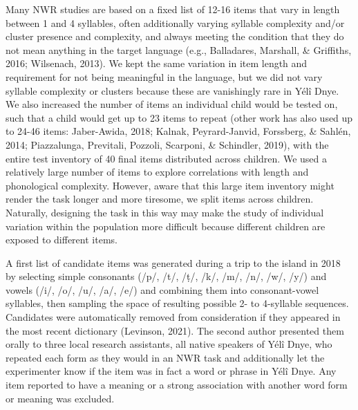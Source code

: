 \documentclass[
  american,
  ,man,floatsintext]{apa6}
\begin{document}
Many NWR studies are based on a fixed list of 12-16 items that vary in length between 1 and 4 syllables, often additionally varying syllable complexity and/or cluster presence and complexity, and always meeting the condition that they do not mean anything in the target language (e.g., Balladares, Marshall, \& Griffiths, 2016; Wilsenach, 2013). We kept the same variation in item length and requirement for not being meaningful in the language, but we did not vary syllable complexity or clusters because these are vanishingly rare in Yélî Dnye. We also increased the number of items an individual child would be tested on, such that a child would get up to 23 items to repeat (other work has also used up to 24-46 items: Jaber-Awida, 2018; Kalnak, Peyrard-Janvid, Forssberg, \& Sahlén, 2014; Piazzalunga, Previtali, Pozzoli, Scarponi, \& Schindler, 2019), with the entire test inventory of 40 final items distributed across children. We used a relatively large number of items to explore correlations with length and phonological complexity. However, aware that this large item inventory might render the task longer and more tiresome, we split items across children. Naturally, designing the task in this way may make the study of individual variation within the population more difficult because different children are exposed to different items.

A first list of candidate items was generated during a trip to the island in 2018 by selecting simple consonants (/p/, /t/, /ṭ/, /k/, /m/, /n/, /w/, /y/) and vowels (/i/, /o/, /u/, /a/, /e/) and combining them into consonant-vowel syllables, then sampling the space of resulting possible 2- to 4-syllable sequences. Candidates were automatically removed from consideration if they appeared in the most recent dictionary (Levinson, 2021). The second author presented them orally to three local research assistants, all native speakers of Yélî Dnye, who repeated each form as they would in an NWR task and additionally let the experimenter know if the item was in fact a word or phrase in Yélî Dnye. Any item reported to have a meaning or a strong association with another word form or meaning was excluded.
\end{document}
